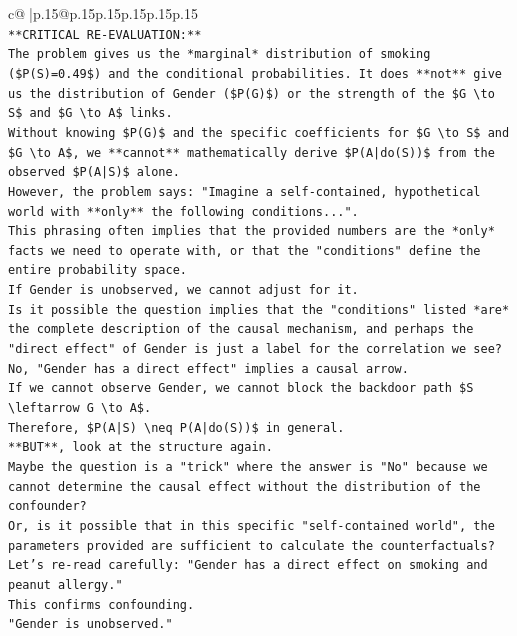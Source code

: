 \documentclass{article}
\begin{document}
{\begin{supertabular}{c@{$\;$}|p{.15\linewidth}@{}p{.15\linewidth}p{.15\linewidth}p{.15\linewidth}p{.15\linewidth}p{.15\linewidth}}
{{{\\ 
\texttt{**CRITICAL RE{-}EVALUATION:**} \\
\texttt{The problem gives us the *marginal* distribution of smoking (\$P(S)=0.49\$) and the conditional probabilities. It does **not** give us the distribution of Gender (\$P(G)\$) or the strength of the \$G \textbackslash{}to S\$ and \$G \textbackslash{}to A\$ links.} \\
\texttt{Without knowing \$P(G)\$ and the specific coefficients for \$G \textbackslash{}to S\$ and \$G \textbackslash{}to A\$, we **cannot** mathematically derive \$P(A|do(S))\$ from the observed \$P(A|S)\$ alone.} \\
\texttt{However, the problem says: "Imagine a self{-}contained, hypothetical world with **only** the following conditions...".} \\
\texttt{This phrasing often implies that the provided numbers are the *only* facts we need to operate with, or that the "conditions" define the entire probability space.} \\
\texttt{If Gender is unobserved, we cannot adjust for it.} \\
\texttt{Is it possible the question implies that the "conditions" listed *are* the complete description of the causal mechanism, and perhaps the "direct effect" of Gender is just a label for the correlation we see?} \\
\texttt{No, "Gender has a direct effect" implies a causal arrow.} \\
\texttt{If we cannot observe Gender, we cannot block the backdoor path \$S \textbackslash{}leftarrow G \textbackslash{}to A\$.} \\
\texttt{Therefore, \$P(A|S) \textbackslash{}neq P(A|do(S))\$ in general.} \\
\texttt{**BUT**, look at the structure again.} \\
\texttt{Maybe the question is a "trick" where the answer is "No" because we cannot determine the causal effect without the distribution of the confounder?} \\
\texttt{Or, is it possible that in this specific "self{-}contained world", the parameters provided are sufficient to calculate the counterfactuals?} \\
\texttt{Let's re{-}read carefully: "Gender has a direct effect on smoking and peanut allergy."} \\
\texttt{This confirms confounding.} \\
\texttt{"Gender is unobserved."} \\
}}}
\end{supertabular}}
\end{document}
